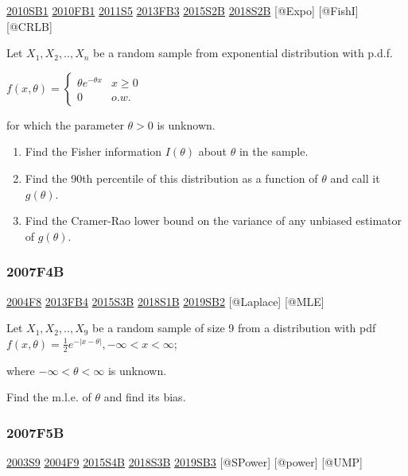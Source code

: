\documentclass[6pt,Portrait]{article}
\begin{document}
\protect\hyperlink{sb1-1}{2010SB1} \protect\hyperlink{fb1-1}{2010FB1}
\protect\hyperlink{s5-2}{2011S5} \protect\hyperlink{fb3-2}{2013FB3}
\protect\hyperlink{s2b-1}{2015S2B} \protect\hyperlink{s2b-2}{2018S2B}
{[}@Expo{]} {[}@FishI{]} {[}@CRLB{]}

Let \(X_1,X_2,..,X_n\) be a random sample from exponential distribution
with p.d.f.

\(f(x,\theta)=\begin{cases}\theta e^{-\theta x}& x\ge0\\0& o.w.\end{cases}\)

for which the parameter \(\theta>0\) is unknown.

\begin{enumerate}
\def\labelenumi{(\alph{enumi})}
\item
  Find the Fisher information \(I(\theta)\) about \(\theta\) in the
  sample.
\item
  Find the 90th percentile of this distribution as a function of
  \(\theta\) and call it \(g(\theta)\).
\item
  Find the Cramer-Rao lower bound on the variance of any unbiased
  estimator of \(g(\theta)\).
\end{enumerate}

\hypertarget{f4b}{%
\subsubsection{2007F4B}\label{f4b}}

\protect\hyperlink{f8-2}{2004F8} \protect\hyperlink{fb4-2}{2013FB4}
\protect\hyperlink{s3b-1}{2015S3B} \protect\hyperlink{s1b-2}{2018S1B}
\protect\hyperlink{sb2-3}{2019SB2} {[}@Laplace{]} {[}@MLE{]}

Let \(X_1,X_2,..,X_9\) be a random sample of size 9 from a distribution
with pdf \(f(x,\theta) =\frac12e^{-|x-\theta|}, -\infty<x<\infty\);

where \(-\infty<\theta<\infty\) is unknown.

Find the m.l.e. of \(\theta\) and find its bias.

\hypertarget{f5b}{%
\subsubsection{2007F5B}\label{f5b}}

\protect\hyperlink{s9}{2003S9} \protect\hyperlink{f9-2}{2004F9}
\protect\hyperlink{s4b-1}{2015S4B} \protect\hyperlink{s3b-2}{2018S3B}
\protect\hyperlink{sb3-3}{2019SB3} {[}@SPower{]} {[}@power{]} {[}@UMP{]}
\end{document}
